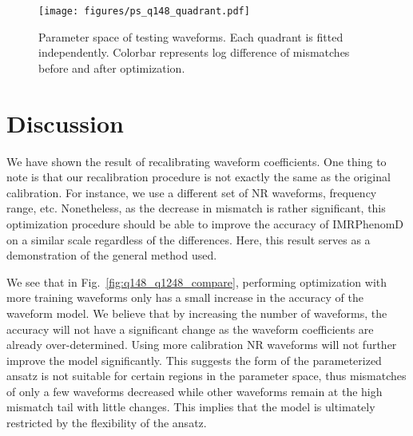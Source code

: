 \documentclass[twocolumn]{aastex631}
\begin{document}
\begin{figure}[t]
	\centering
	\texttt{[image: figures/ps\_q148\_quadrant.pdf]}
	\caption{Parameter space of testing waveforms. Each quadrant is fitted independently. Colorbar represents log difference of mismatches before and after optimization.}
	\label{fig:ps_q148_quadrant}
\end{figure}

\section{Discussion} \label{sec:discussion}


We have shown the result of recalibrating waveform coefficients. One thing to note is that our recalibration procedure is not exactly the same as the original calibration. For instance, we use a different set of NR waveforms, frequency range, etc. Nonetheless, as the decrease in mismatch is rather significant, this optimization procedure should be able to improve the accuracy of IMRPhenomD on a similar scale regardless of the differences. Here, this result serves as a demonstration of the general method used.  

We see that in Fig.~\ref{fig:q148_q1248_compare}, performing optimization with more training waveforms only has a small increase in the accuracy of the waveform model. We believe that by increasing the number of waveforms, the accuracy will not have a significant change as the waveform coefficients are already over-determined. Using more calibration NR waveforms will not further improve the model significantly. This suggests the form of the parameterized ansatz is not suitable for certain regions in the parameter space, thus mismatches of only a few waveforms decreased while other waveforms remain at the high mismatch tail with little changes. This implies that the model is ultimately restricted by the flexibility of the ansatz. 
\end{document}
